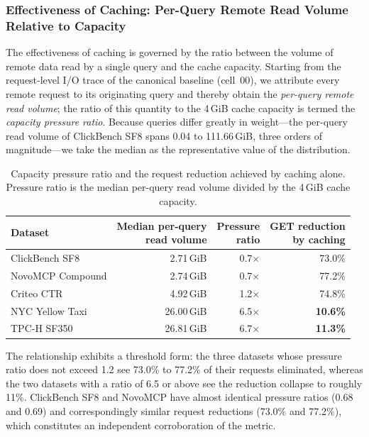 \subsubsection{Effectiveness of Caching: Per-Query Remote Read Volume Relative to Capacity}
\label{subsec:pressure}

The effectiveness of caching is governed by the ratio between the volume of
remote data read by a single query and the cache capacity. Starting from the
request-level I/O trace of the canonical baseline (cell~00), we attribute every
remote request to its originating query and thereby obtain the \emph{per-query
remote read volume}; the ratio of this quantity to the 4\,GiB cache capacity is
termed the \emph{capacity pressure ratio}. Because queries differ greatly in
weight---the per-query read volume of ClickBench SF8 spans 0.04 to
111.66\,GiB, three orders of magnitude---we take the median as the
representative value of the distribution.

\begin{table}[t]
\centering
\caption{Capacity pressure ratio and the request reduction achieved by caching
alone. Pressure ratio is the median per-query read volume divided by the
4\,GiB cache capacity.}
\label{tab:pressure}
\footnotesize
\setlength{\tabcolsep}{4pt}
\begin{tabular}{@{}lrrr@{}}
\toprule
Dataset & \makecell[r]{Median per-query\\read volume} &
\makecell[r]{Pressure\\ratio} & \makecell[r]{GET reduction\\by caching} \\
\midrule
ClickBench SF8   & 2.71\,GiB  & 0.7$\times$ & 73.0\% \\
NovoMCP Compound & 2.74\,GiB  & 0.7$\times$ & 77.2\% \\
Criteo CTR       & 4.92\,GiB  & 1.2$\times$ & 74.8\% \\
NYC Yellow Taxi  & 26.00\,GiB & 6.5$\times$ & \textbf{10.6\%} \\
TPC-H SF350      & 26.81\,GiB & 6.7$\times$ & \textbf{11.3\%} \\
\bottomrule
\end{tabular}
\end{table}

The relationship exhibits a threshold form: the three datasets whose pressure
ratio does not exceed 1.2 see 73.0\% to 77.2\% of their requests eliminated,
whereas the two datasets with a ratio of 6.5 or above see the reduction collapse
to roughly 11\%. ClickBench SF8 and NovoMCP have almost identical pressure
ratios (0.68 and 0.69) and correspondingly similar request reductions (73.0\%
and 77.2\%), which constitutes an independent corroboration of the metric.


